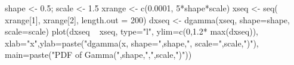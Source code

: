 \begin{Schunk}
\begin{Sinput}
  shape <- 0.5; scale <- 1.5
  xrange <- c(0.0001, 5*shape*scale)
  xseq <- seq( xrange[1], xrange[2], length.out = 200)
  dxseq <- dgamma(xseq, shape=shape, scale=scale)
  plot(dxseq ~ xseq, type="l", ylim=c(0,1.2* max(dxseq)), xlab="x",ylab=paste("dgamma(x, shape=",shape,", scale=",scale,")"), main=paste("PDF of Gamma(",shape,",",scale,")"))
\end{Sinput}
\end{Schunk}
